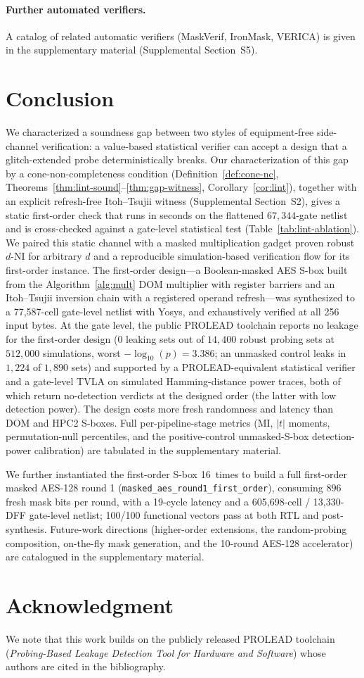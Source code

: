 \documentclass[lettersize,journal]{IEEEtran}
\begin{document}
\paragraph{Further automated verifiers.}
A catalog of related automatic verifiers (MaskVerif, IronMask, VERICA) is
given in the supplementary material (Supplemental Section~S5).

\section{Conclusion}
\label{sec:conclusion}
We characterized a soundness gap between two
styles of equipment-free side-channel verification: a value-based
statistical verifier can accept a design that a glitch-extended
probe deterministically breaks. Our characterization of this gap by
a cone-non-completeness condition
(Definition~\ref{def:cone-nc},
Theorems~\ref{thm:lint-sound}--\ref{thm:gap-witness},
Corollary~\ref{cor:lint}), together with an explicit refresh-free
Itoh--Tsujii witness (Supplemental Section~S2), gives
a static first-order check that
runs in seconds on the flattened $67{,}344$-gate netlist and is
cross-checked against a gate-level statistical test
(Table~\ref{tab:lint-ablation}). We paired this static channel with
a masked multiplication gadget proven robust $d$-NI for arbitrary $d$ and a
reproducible simulation-based verification flow for its first-order instance.  The first-order design---a
Boolean-masked AES S-box built from the Algorithm~\ref{alg:mult} DOM
multiplier with register barriers and an Itoh--Tsujii inversion chain
with a registered operand refresh---was synthesized to a
77{,}587-cell gate-level netlist with Yosys,
and exhaustively verified at all 256 input bytes.  At the gate level, the public PROLEAD
toolchain reports no leakage for the first-order design ($0$ leaking sets out of $14{,}400$ robust probing
sets at $512{,}000$ simulations, worst $-\log_{10}(p)=3.386$; an
unmasked control leaks in $1{,}224$ of $1{,}890$ sets) and
supported by a PROLEAD-equivalent statistical verifier and a gate-level
TVLA on simulated Hamming-distance power traces, both of which return
no-detection verdicts at the designed order (the latter with low detection
power).  The design costs more fresh randomness and latency than DOM and
HPC2 S-boxes.  Full per-pipeline-stage
metrics (MI, $|t|$ moments, permutation-null percentiles, and the
positive-control unmasked-S-box detection-power calibration) are
tabulated in the supplementary material.

We further instantiated the first-order S-box 16~times to build a full
first-order masked AES-128 round 1 (\texttt{masked\_aes\_round1\_first\_order}),
consuming $896$ fresh mask bits per round, with a 19-cycle latency and
a 605{,}698-cell / 13{,}330-DFF gate-level netlist; 100/100 functional
vectors pass at both RTL and post-synthesis.  Future-work directions
(higher-order extensions, the random-probing composition, on-the-fly
mask generation, and the 10-round AES-128 accelerator) are catalogued
in the supplementary material.

\section*{Acknowledgment}
We note that this work builds on the publicly released PROLEAD toolchain
(\textit{Probing-Based Leakage Detection Tool for Hardware and
Software}) whose authors are cited in the bibliography.



\end{document}
